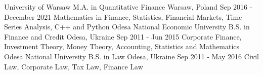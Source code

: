 
\begin{cvsection}[Education]
  \cvexperience
    {University of Warsaw}
    {M.A. in Quantitative Finance}
    {Warsaw, Poland}
    {Sep 2016 - December 2021}
    {
      Mathematics in Finance, Statistics, Financial Markets, Time Series Analysis, C++ and Python
    }
  \cvexperience
    {Odesa National Economic University}
    {B.S. in Finance and Credit}
    {Odesa, Ukraine}
    {Sep 2011 - Jun 2015}
    {
      Corporate Finance, Investment Theory, Money Theory, Accounting, Statistics and Mathematics
    }
  \cvexperience
    {Odesa National University}
    {B.S. in Law}
    {Odesa, Ukraine}
    {Sep 2011 - May 2016}
    {
      Civil Law, Corporate Law, Tax Law, Finance Law
    }

\end{cvsection}
